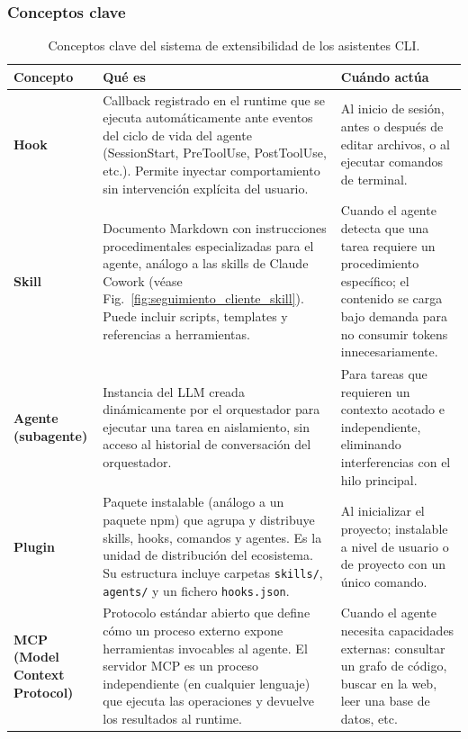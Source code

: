 \documentclass[11pt, letterpaper]{article}
\begin{document}
\subsubsection{Conceptos clave}
\label{sec:conceptos_clave_ext}
\begin{table}[H]
\centering
\begin{tabular}{p{2.5cm} p{8cm} p{5.5cm}}
\toprule
\textbf{Concepto} & \textbf{Qué es} & \textbf{Cuándo actúa} \\
\midrule
\textbf{Hook} & Callback registrado en el runtime que se ejecuta automáticamente ante eventos del ciclo de vida del agente (SessionStart, PreToolUse, PostToolUse, etc.). Permite inyectar comportamiento sin intervención explícita del usuario. & Al inicio de sesión, antes o después de editar archivos, o al ejecutar comandos de terminal. \\
\textbf{Skill} & Documento Markdown con instrucciones procedimentales especializadas para el agente, análogo a las skills de Claude Cowork (véase Fig.~\ref{fig:seguimiento_cliente_skill}). Puede incluir scripts, templates y referencias a herramientas. & Cuando el agente detecta que una tarea requiere un procedimiento específico; el contenido se carga bajo demanda para no consumir tokens innecesariamente. \\
\textbf{Agente (subagente)} & Instancia del LLM creada dinámicamente por el orquestador para ejecutar una tarea en aislamiento, sin acceso al historial de conversación del orquestador. & Para tareas que requieren un contexto acotado e independiente, eliminando interferencias con el hilo principal. \\
\textbf{Plugin} & Paquete instalable (análogo a un paquete npm) que agrupa y distribuye skills, hooks, comandos y agentes. Es la unidad de distribución del ecosistema. Su estructura incluye carpetas \texttt{skills/}, \texttt{agents/} y un fichero \texttt{hooks.json}. & Al inicializar el proyecto; instalable a nivel de usuario o de proyecto con un único comando. \\
\textbf{MCP (Model Context Protocol)}\cite{anthropic_mcp_2024} & Protocolo estándar abierto que define cómo un proceso externo expone herramientas invocables al agente. El servidor MCP es un proceso independiente (en cualquier lenguaje) que ejecuta las operaciones y devuelve los resultados al runtime. & Cuando el agente necesita capacidades externas: consultar un grafo de código, buscar en la web, leer una base de datos, etc. \\
\bottomrule
\end{tabular}
\caption{Conceptos clave del sistema de extensibilidad de los asistentes CLI.}
\label{tab:conceptos_extensibilidad}
\end{table}
\end{document}
